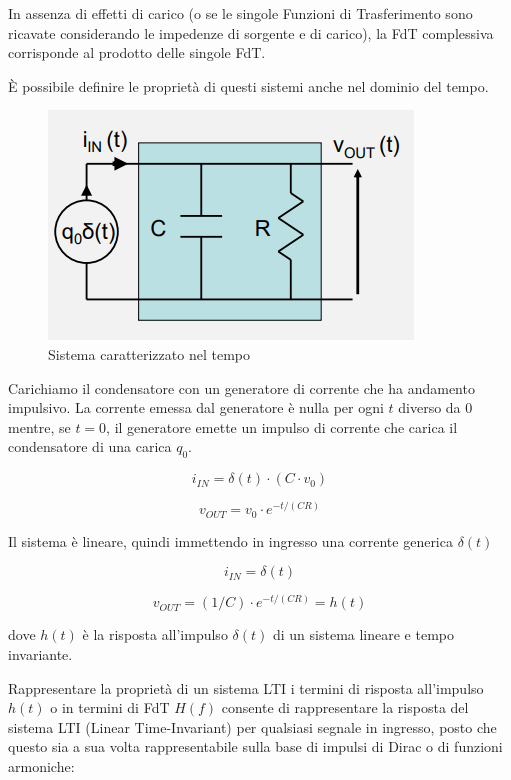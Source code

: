 \documentclass{article}
\begin{document}
\vspace{1mm}

In assenza di effetti di carico (o se le singole Funzioni di Trasferimento sono ricavate considerando le impedenze di sorgente e di carico), la FdT complessiva corrisponde al prodotto delle singole FdT.

\vspace{1mm}

È possibile definire le proprietà di questi sistemi anche nel dominio del tempo.

\begin{figure}[h]
  \centering
  \includegraphics[scale=0.7]{IM_doppio_dipolo_tempo}
  \caption{Sistema caratterizzato nel tempo}
  \label{Schema_doppio_dipolo_tempo}
\end{figure}

Carichiamo il condensatore con un generatore di corrente che ha andamento impulsivo. La corrente emessa dal generatore è nulla per ogni $t$ diverso da 0 mentre, se $t=0$, il generatore emette un impulso di corrente che carica il condensatore di una carica $q_0$. 

\[i_{IN} = \delta (t) \cdot (C \cdot  v_0)\]

\[v_{OUT} = v_0 \cdot  e^{-t/(CR)}\]

Il sistema è lineare, quindi immettendo in ingresso una corrente generica $\delta (t)$

\[i_{IN} = \delta (t)\]

\[v_{OUT} = (1 / C) \cdot  e^{-t/(CR)} = h(t)\]

dove $h(t)$ è la risposta all'impulso $\delta(t)$ di un sistema lineare e tempo invariante.

\clearpage
Rappresentare la proprietà di un sistema LTI i termini di risposta all'impulso $h(t)$ o in termini di FdT $H(f)$ consente di rappresentare la risposta del sistema LTI (Linear Time-Invariant) per qualsiasi segnale in ingresso, posto che questo sia a sua volta rappresentabile sulla base di impulsi di Dirac o di funzioni armoniche:
\end{document}
